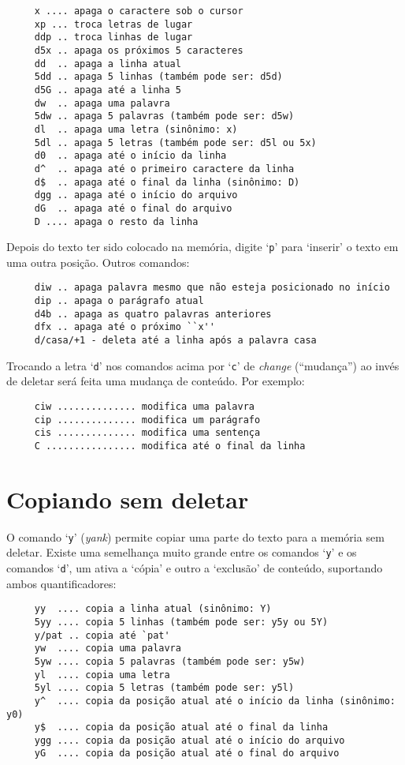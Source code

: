 \begin{verbatim}
     x .... apaga o caractere sob o cursor
     xp ... troca letras de lugar
     ddp .. troca linhas de lugar
     d5x .. apaga os próximos 5 caracteres
     dd  .. apaga a linha atual
     5dd .. apaga 5 linhas (também pode ser: d5d)
     d5G .. apaga até a linha 5
     dw  .. apaga uma palavra
     5dw .. apaga 5 palavras (também pode ser: d5w)
     dl  .. apaga uma letra (sinônimo: x)
     5dl .. apaga 5 letras (também pode ser: d5l ou 5x)
     d0  .. apaga até o início da linha
     d^  .. apaga até o primeiro caractere da linha
     d$  .. apaga até o final da linha (sinônimo: D)
     dgg .. apaga até o início do arquivo
     dG  .. apaga até o final do arquivo
     D .... apaga o resto da linha
\end{verbatim}

Depois do texto ter sido colocado na memória, digite `{\tt p}' para `inserir' o
texto em uma outra posição. Outros comandos:

\begin{verbatim}
     diw .. apaga palavra mesmo que não esteja posicionado no início
     dip .. apaga o parágrafo atual
     d4b .. apaga as quatro palavras anteriores
     dfx .. apaga até o próximo ``x''
     d/casa/+1 - deleta até a linha após a palavra casa
\end{verbatim}

Trocando a letra `{\tt d}' nos comandos acima por `{\tt c}' de {\em change}
(``mudança'') ao invés de deletar será feita uma mudança de conteúdo.  Por
exemplo:

\begin{verbatim}
     ciw .............. modifica uma palavra
     cip .............. modifica um parágrafo
     cis .............. modifica uma sentença
     C ................ modifica até o final da linha
\end{verbatim}

\section{Copiando sem deletar}\label{Copiando sem deletar}

O comando `{\tt y}' ({\em yank}) permite copiar uma parte do texto para a
memória sem deletar.  Existe uma semelhança muito grande entre os comandos
`{\tt y}' e os comandos `{\tt d}', um ativa a `cópia' e outro a `exclusão' 
de conteúdo, suportando ambos quantificadores:

\begin{verbatim}
     yy  .... copia a linha atual (sinônimo: Y)
     5yy .... copia 5 linhas (também pode ser: y5y ou 5Y)
     y/pat .. copia até `pat'
     yw  .... copia uma palavra
     5yw .... copia 5 palavras (também pode ser: y5w)
     yl  .... copia uma letra
     5yl .... copia 5 letras (também pode ser: y5l)
     y^  .... copia da posição atual até o início da linha (sinônimo: y0)
     y$  .... copia da posição atual até o final da linha
     ygg .... copia da posição atual até o início do arquivo
     yG  .... copia da posição atual até o final do arquivo
\end{verbatim}

